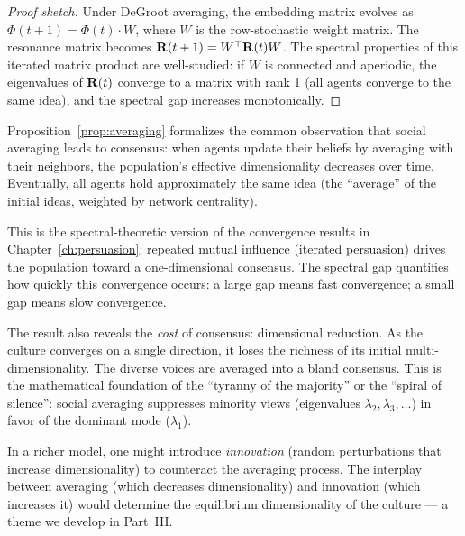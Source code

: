 \begin{proof}[Proof sketch]
Under DeGroot averaging, the embedding matrix evolves as $\Phi(t+1) = \Phi(t)
\cdot W$, where $W$ is the row-stochastic weight matrix. The resonance matrix
becomes $\mathbf{R}(t+1) = W^\top \mathbf{R}(t) W$. The spectral properties of this
iterated matrix product are well-studied: if $W$ is connected and aperiodic,
the eigenvalues of $\mathbf{R}(t)$ converge to a matrix with rank 1 (all agents
converge to the same idea), and the spectral gap increases monotonically.
\end{proof}

\begin{interpretation}
\label{interp:convergence}
Proposition~\ref{prop:averaging} formalizes the common observation that social
averaging leads to consensus: when agents update their beliefs by averaging
with their neighbors, the population's effective dimensionality decreases over
time. Eventually, all agents hold approximately the same idea (the ``average''
of the initial ideas, weighted by network centrality).

This is the spectral-theoretic version of the convergence results in
Chapter~\ref{ch:persuasion}: repeated mutual influence (iterated persuasion)
drives the population toward a one-dimensional consensus. The spectral gap
quantifies how quickly this convergence occurs: a large gap means fast
convergence; a small gap means slow convergence.

The result also reveals the \emph{cost} of consensus: dimensional reduction.
As the culture converges on a single direction, it loses the richness of its
initial multi-dimensionality. The diverse voices are averaged into a bland
consensus. This is the mathematical foundation of the ``tyranny of the
majority'' or the ``spiral of silence'': social averaging suppresses minority
views (eigenvalues $\lambda_2, \lambda_3, \ldots$) in favor of the dominant
mode ($\lambda_1$).

In a richer model, one might introduce \emph{innovation} (random perturbations
that increase dimensionality) to counteract the averaging process. The
interplay between averaging (which decreases dimensionality) and innovation
(which increases it) would determine the equilibrium dimensionality of the
culture --- a theme we develop in Part~III.
\end{interpretation}

